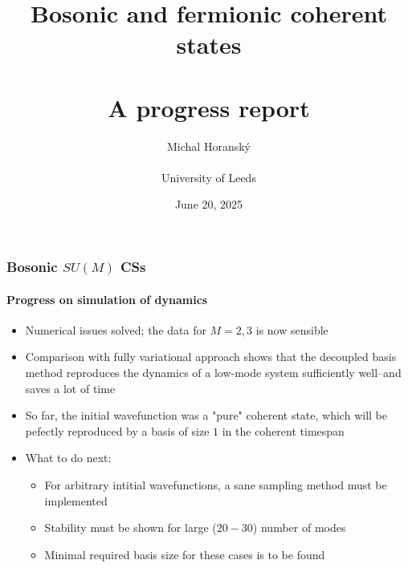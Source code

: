 \documentclass[english]{beamer}
\begin{document}
  \title{Bosonic and fermionic coherent states\\\hfill\\A progress report}
  \author[Michal Horanský]{Michal Horanský\\\hfill\\University of Leeds}
  \date{June 20, 2025}
  \begin{frame}
    \titlepage
  \end{frame}
  
  
  \begin{frame}
  	\frametitle{Bosonic $SU(M)$ CSs}
  	\framesubtitle{Progress on simulation of dynamics}
  	\begin{itemize}
  		\item Numerical issues solved; the data for $M=2,3$ is now sensible\\
  		\item Comparison with fully variational approach shows that the decoupled basis method reproduces the dynamics of a low-mode system sufficiently well--and saves a lot of time
  		\item So far, the initial wavefunction was a "pure" coherent state, which will be pefectly reproduced by a basis of size $1$ in the coherent timespan
  		\item What to do next:
  		\begin{itemize}
  			\item For arbitrary intitial wavefunctions, a sane sampling method must be implemented
  			\item Stability must be shown for large ($20-30$) number of modes
  			\item Minimal required basis size for these cases is to be found
  		\end{itemize}
  	\end{itemize}
  \end{frame}
  
\end{document}

